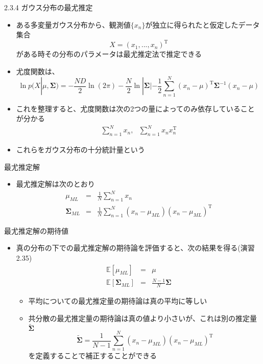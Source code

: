 \begin{frame}{2.3.4 ガウス分布の最尤推定}
 \begin{itemize}
  \item  ある多変量ガウス分布から、観測値$\{x_n\}$が独立に得られたと仮定したデータ集合
         \begin{equation}
          X=(x_1,...,x_n)^{\mathrm{T}}
         \end{equation}
         がある時その分布のパラメータは最尤推定法で推定できる
  \item 尤度関数は、
        \begin{equation}
         \ln  p(X|\mu, \bm{\Sigma}) = -\frac{ND}{2}\ln (2\pi)-\frac{N}{2}\ln |\bm{\Sigma}|-\frac{1}{2}\sum_{n=1}^{N}(x_n-\mu)^{\mathrm{T}}\bm{\Sigma}^{-1}(x_n-\mu)
        \end{equation}
  \item これを整理すると、尤度関数は次の2つの量によってのみ依存していることが分かる
        \begin{eqnarray}
         \sum_{n=1}^{N}x_n, \ \ \  \sum_{n=1}^{N}x_nx_n^{\mathrm{T}}
        \end{eqnarray}
  \item これらをガウス分布の\alert{十分統計量}という
 \end{itemize}
\end{frame}

\begin{frame}{最尤推定解}
 \begin{itemize}
  \item 最尤推定解は次のとおり
        \begin{eqnarray}
         \mu_{ML} &=& \frac{1}{N}\sum_{n=1}^{N}x_n\\
         \bm{\Sigma}_{ML}&=&\frac{1}{N}\sum_{n=1}^{N}(x_n-\mu_{ML})(x_n-\mu_{ML})^{\mathrm{T}}
        \end{eqnarray}
 \end{itemize}
\end{frame}

\begin{frame}{最尤推定解の期待値}
 \begin{itemize}
  \item 真の分布の下での最尤推定解の期待論を評価すると、次の結果を得る(演習2.35)
        \begin{eqnarray}
         \mathbb{E}[\mu_{ML}]&=&\mu\\
         \mathbb{E}[\bm{\Sigma}_{ML}]&=&\frac{N-1}{N}\bm{\Sigma}
        \end{eqnarray}
        \begin{itemize}
         \item 平均についての最尤推定量の期待論は真の平均に等しい
         \item 共分散の最尤推定量の期待論は真の値より小さいが、これは別の推定量$\widetilde{\bm{\Sigma}}$
               \begin{equation}
                \widetilde{\bm{\Sigma}} = \frac{1}{N-1}\sum_{n=1}^{N}(x_n-\mu_{ML})(x_n-\mu_{ML})^{\mathrm{T}}
               \end{equation}
               を定義することで補正することができる
        \end{itemize}
 \end{itemize}
\end{frame}
